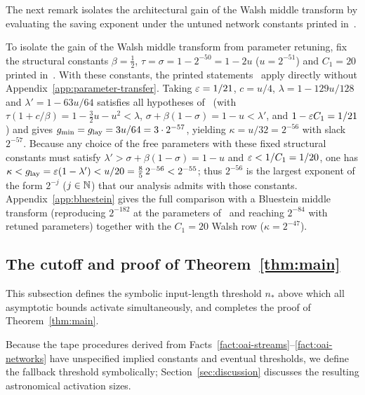 The next remark isolates the architectural gain of the Walsh middle transform by evaluating the saving exponent under
the untuned network constants printed in~\cite{OAI26}.

\begin{remark}\label{rem:printed-optimal}
To isolate the gain of the Walsh middle transform from parameter retuning, fix the structural constants $\beta=\frac12$,
$\tau=\sigma=1-2^{-50}=1-2u$ ($u=2^{-51}$) and $C_1=20$ printed in~\cite[Prop.~14]{OAI26}. With these constants, the
printed statements~\cite[Lemma~12, Prop.~14]{OAI26} apply directly without Appendix~\ref{app:parameter-transfer}. Taking
$\varepsilon=1/21$, $c=u/4$, $\lambda=1-129u/128$ and $\lambda'=1-63u/64$ satisfies all hypotheses of~\cite[Prop.~14]{OAI26}
(with $\tau(1+c/\beta)=1-\frac32u-u^2<\lambda$, $\sigma+\beta(1-\sigma)=1-u<\lambda'$, and $1-\varepsilon C_1=1/21$) and gives
$g_{\min}=g_{\rm lay}=3u/64=3\cdot2^{-57}$, yielding $\kappa=u/32=2^{-56}$ with slack $2^{-57}$. Because any choice of
the free parameters with these fixed structural constants must satisfy $\lambda'>\sigma+\beta(1-\sigma)=1-u$ and
$\varepsilon<1/C_1=1/20$, one has $\kappa<g_{\rm lay}=\varepsilon(1-\lambda')<u/20=\frac85\,2^{-56}<2^{-55}$; thus $2^{-56}$ is the
largest exponent of the form $2^{-j}$ ($j\in\mathbb{N}$) that our analysis admits with those constants.
Appendix~\ref{app:bluestein} gives the full comparison with a Bluestein middle transform (reproducing $2^{-182}$ at the
parameters of~\cite[(38)]{OAI26} and reaching $2^{-84}$ with retuned parameters) together with the $C_1=20$ Walsh row
($\kappa=2^{-47}$).
\end{remark}

\subsection{The cutoff and proof of Theorem~\ref{thm:main}}\label{sec:main-thm}

This subsection defines the symbolic input-length threshold $n_*$ above which all asymptotic bounds activate
simultaneously, and completes the proof of Theorem~\ref{thm:main}.

Because the tape procedures derived from Facts~\ref{fact:oai-streams}--\ref{fact:oai-networks} have unspecified implied
constants and eventual thresholds, we define the fallback threshold symbolically; Section~\ref{sec:discussion} discusses
the resulting astronomical activation sizes.

